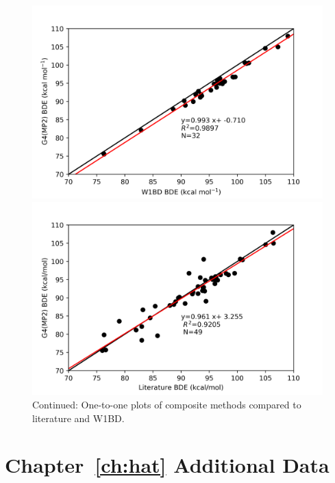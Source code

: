 \begin{figure}[H]\ContinuedFloat
\hspace*{-1.8cm}
\begin{minipage}{8cm}
  \centering
  \includegraphics[width=\textwidth]{figures/w1bd-g4mp2}
\end{minipage}%
\begin{minipage}{8cm}
  \centering
  \includegraphics[width=\textwidth]{figures/lit-g4mp2}
\end{minipage}
\caption{Continued: One-to-one plots of composite methods compared to literature and W1BD.}
\end{figure}



\chapter{Chapter~\protect\ref{ch:hat} Additional Data}\label{ap:hat}


